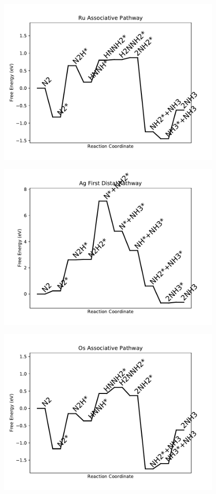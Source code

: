 \begin{figure}
\includegraphics[width=0.8\linewidth]{data/plots/Ru_associative.pdf}
\end{figure}

\begin{figure}
\includegraphics[width=0.8\linewidth]{data/plots/Ag_distal_1.pdf}
\end{figure}

\begin{figure}
\includegraphics[width=0.8\linewidth]{data/plots/Os_associative.pdf}
\end{figure}

